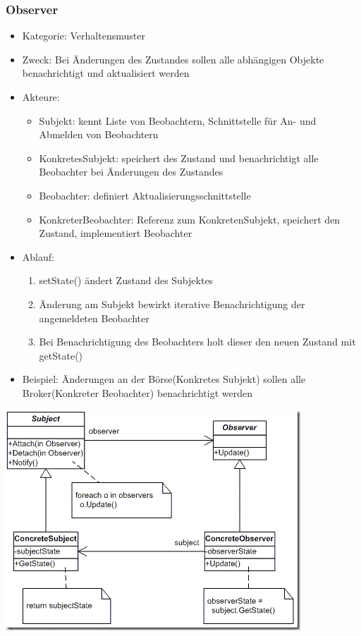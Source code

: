 \documentclass[11pt, fleqn, a4paper, leqno]{scrartcl} %
\begin{document}
		\subsubsection{Observer}
			\begin{itemize}
				\item Kategorie: Verhaltensmuster
				\item Zweck: Bei Änderungen des Zustandes sollen alle abhängigen Objekte benachrichtigt und aktualisiert werden 
				\item Akteure:
					\begin{itemize}
						\item Subjekt: kennt Liste von Beobachtern, Schnittstelle für An- und Abmelden von Beobachtern
						\item KonkretesSubjekt: speichert des Zustand und benachrichtigt alle Beobachter bei Änderungen des Zustandes
						\item Beobachter: definiert Aktualisierungsschnittstelle
						\item KonkreterBeobachter: Referenz zum KonkretenSubjekt, speichert den Zustand, implementiert Beobachter
					\end{itemize}
				\item Ablauf:
					\begin{enumerate}
						\item setState() ändert Zustand des Subjektes
						\item Änderung am Subjekt bewirkt iterative Benachrichtigung der angemeldeten Beobachter
						\item Bei Benachrichtigung des Beobachters holt dieser den neuen Zustand mit getState()
					\end{enumerate}
				\item Beispiel: Änderungen an der Börse(Konkretes Subjekt) sollen alle Broker(Konkreter Beobachter) benachrichtigt werden
			\end{itemize}
			\includegraphics[scale=0.5]{images/observer.png}
		\newpage
\end{document}
